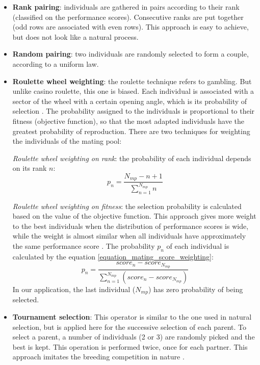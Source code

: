 \documentclass[twocol]{ametsoc}
\begin{document}
\begin{itemize}
	\item \textbf{Rank pairing}: individuals are gathered in pairs according to their rank (classified on the performance scores). Consecutive ranks are put together (odd rows are associated with even rows). This approach is easy to achieve, but does not look like a natural process.
	
	\item \textbf{Random pairing}: two individuals are randomly selected to form a couple, according to a uniform law.
	
	\item \textbf{Roulette wheel weighting}: the roulette technique refers to gambling. But unlike casino roulette, this one is biased. Each individual is associated with a sector of the wheel with a certain opening angle, which is its probability of selection \citep{Haupt2004}. The probability assigned to the individuals is proportional to their fitness (objective function), so that the most adapted individuals have the greatest probability of reproduction. There are two techniques for weighting the individuals of the mating pool:
	
	\textit{Roulette wheel weighting on rank}: the probability of each individual depends on its rank $n$:
	\begin{equation}
	p_{n}=\dfrac{N_{mp}-n+1}{\sum^{N_{mp}}_{n=1}n}
	\label{equation_mating_rank_weighting}
	\end{equation}
	
	\textit{Roulette wheel weighting on fitness}: the selection probability is calculated based on the value of the objective function. This approach gives more weight to the best individuals when the distribution of performance scores is wide, while the weight is almost similar when all individuals have approximately the same performance score \citep{Haupt2004}. The probability $p_{n}$ of each individual is calculated by the equation \ref{equation_mating_score_weighting}:
	\begin{equation}
	p_{n}=\frac{score_{n}-score_{N_{mp}}}{\sum_{n=1}^{N_{mp}} (score_{n}-score_{N_{mp}})}
	\label{equation_mating_score_weighting}
	\end{equation}
	In our application, the last individual ($N_{mp}$) has zero probability of being selected.
	
	
	\item \textbf{Tournament selection}: This operator is similar to the one used in natural selection, but is applied here for the successive selection of each parent. To select a parent, a number of individuals (2 or 3) are randomly picked and the best is kept. This operation is performed twice, once for each partner. This approach imitates the breeding competition in nature \citep{Haupt2004}.
\end{itemize}
\end{document}
